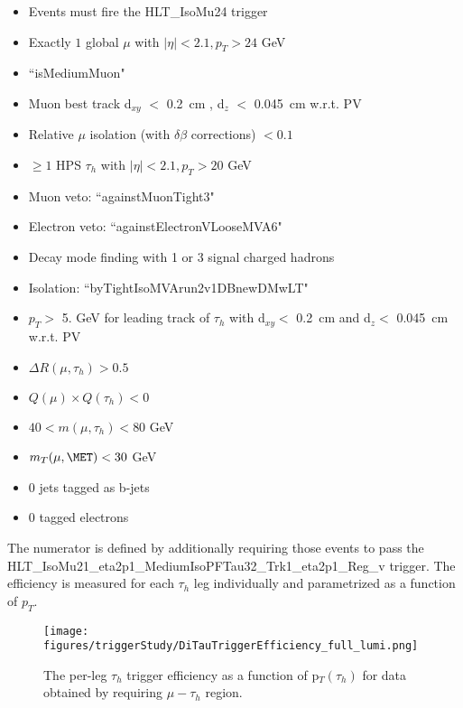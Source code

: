 \begin{itemize}
  \item Events must fire the HLT{\_}IsoMu24 trigger 
  \item Exactly $1$ global $\mu$ with $|\eta| < 2.1, p_{T} > 24$ GeV
  \item ``isMediumMuon"
  \item Muon best track d$_{xy}$ $<$ 0.2~cm , d$_{z}$ $<$ 0.045~cm w.r.t. PV
  \item Relative $\mu$ isolation (with $\delta\beta$ corrections) $< 0.1$
  \item $\ge 1$ HPS $\tau_{h}$ with $|\eta| < 2.1, p_{T} > 20$ GeV
  \item Muon veto: ``againstMuonTight3"
  \item Electron veto: ``againstElectronVLooseMVA6"
  \item Decay mode finding with 1 or 3 signal charged hadrons %
  \item Isolation: ``byTightIsoMVArun2v1DBnewDMwLT"
  \item $p_{T} >$ 5. GeV for leading track of $\tau_{h}$ with d$_{xy} <$ 0.2~cm and d$_{z} <$ 0.045~cm w.r.t. PV
  \item $\Delta R(\mu,\tau_{h}) > 0.5$
  \item $Q(\mu) \times Q(\tau_{h}) < 0 $
  \item $40 < m(\mu, \tau_{h}) < 80$ GeV
  \item $m_{T}(\mu,\MET) < 30$ GeV
  \item 0 jets tagged as b-jets
  \item 0 tagged electrons
\end{itemize}
The numerator is defined by additionally requiring those events to 
pass the \\ 
HLT{\_}IsoMu21{\_}eta2p1{\_}MediumIsoPFTau32{\_}Trk1{\_}eta2p1{\_}Reg{\_}v trigger.
The efficiency is measured for each $\tau_{h}$ leg individually and
parametrized as a function of $p_{T}$. 

\begin{figure}\centering
  \texttt{[image: figures/triggerStudy/DiTauTriggerEfficiency\_full\_lumi.png]}
  \caption{\label{fig:triggertau} The per-leg $\tau_{h}$ trigger efficiency as a function of p$_{T}(\tau_{h})$ for data obtained by requiring $\mu-\tau_{h}$ region.}
\end{figure}

